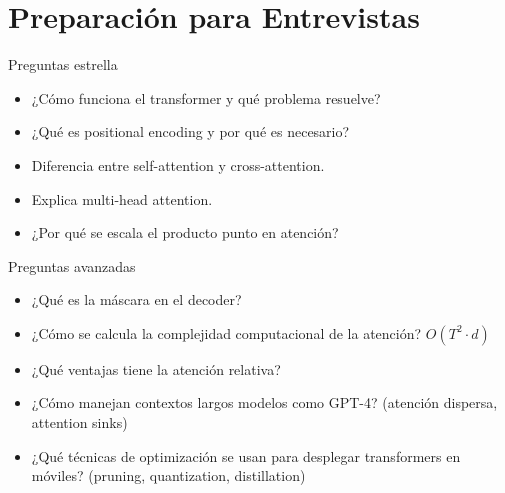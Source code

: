 \documentclass[aspectratio=169, 10pt, xcolor=table]{beamer}
\begin{document}
\section{Preparación para Entrevistas}

\begin{frame}{Preguntas estrella}
    \begin{itemize}
        \item ¿Cómo funciona el transformer y qué problema resuelve?
        \item ¿Qué es positional encoding y por qué es necesario?
        \item Diferencia entre self-attention y cross-attention.
        \item Explica multi-head attention.
        \item ¿Por qué se escala el producto punto en atención?
    \end{itemize}
\end{frame}

\begin{frame}{Preguntas avanzadas}
    \begin{itemize}
        \item ¿Qué es la máscara en el decoder?
        \item ¿Cómo se calcula la complejidad computacional de la atención? $O(T^2 \cdot d)$
        \item ¿Qué ventajas tiene la atención relativa?
        \item ¿Cómo manejan contextos largos modelos como GPT-4? (atención dispersa, attention sinks)
        \item ¿Qué técnicas de optimización se usan para desplegar transformers en móviles? (pruning, quantization, distillation)
    \end{itemize}
\end{frame}


\end{document}
